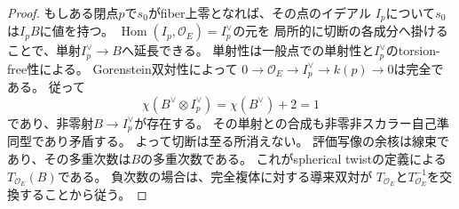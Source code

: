 \begin{proof}
もしある閉点$p$で$s_0$がfiber上零となれば、その点のイデアル
$I_p$について$s_0$は$I_p B$に値を持つ。
$\operatorname{Hom}(I_p,\mathcal O_E)=I_p^\vee$の元を
局所的に切断の各成分へ掛けることで、単射$I_p^\vee\to B$へ延長できる。
単射性は一般点での単射性と$I_p^\vee$のtorsion-free性による。
Gorenstein双対性によって
$0\to\mathcal O_E\to I_p^\vee\to k(p)\to0$は完全である。
従って
\[
 \chi(B^\vee\otimes I_p^\vee)=\chi(B^\vee)+2=1
\]
であり、非零射$B\to I_p^\vee$が存在する。
その単射との合成も非零非スカラー自己準同型であり矛盾する。
よって切断は至る所消えない。
評価写像の余核は線束であり、その多重次数は$B$の多重次数である。
これがspherical twistの定義による$T_{\mathcal O_E}(B)$である。
負次数の場合は、完全複体に対する導来双対が
$T_{\mathcal O_E}$と$T_{\mathcal O_E}^{-1}$を交換することから従う。
\end{proof}

